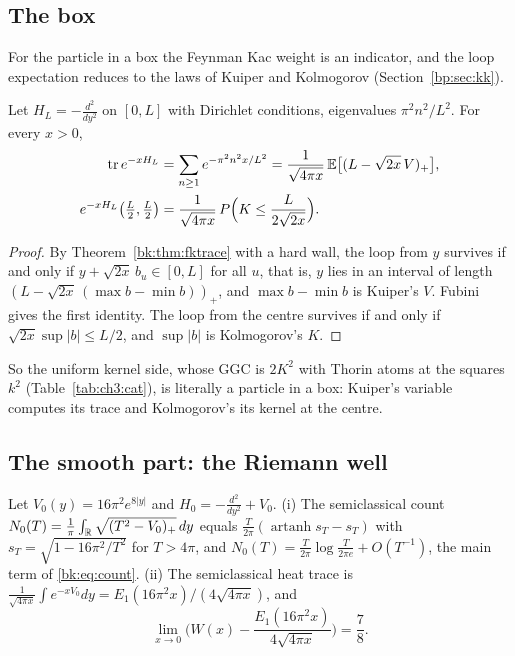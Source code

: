 \subsection{The box}

For the particle in a box the Feynman Kac weight is an indicator, and the loop expectation reduces to the laws of Kuiper and Kolmogorov (Section~\ref{bp:sec:kk}).

\begin{theorem}\label{bk:thm:box}
Let $H_L=-\frac{d^2}{dy^2}$ on $[0,L]$ with Dirichlet conditions, eigenvalues $\pi^2n^2/L^2$. For every $x>0$,
\begin{align*}
\operatorname{tr}e^{-xH_L}&=\sum_{n\ge1}e^{-\pi^2n^2x/L^2}=\frac1{\sqrt{4\pi x}}\,\mathbb{E}\big[(L-\sqrt{2x}\,V)_+\big],\\
e^{-xH_L}\big(\tfrac L2,\tfrac L2\big)&=\frac1{\sqrt{4\pi x}}\,P\Big(K\le\frac L{2\sqrt{2x}}\Big).
\end{align*}
\end{theorem}

\begin{proof}
By Theorem~\ref{bk:thm:fktrace} with a hard wall, the loop from $y$ survives if and only if $y+\sqrt{2x}\,b_u\in[0,L]$ for all $u$, that is, $y$ lies in an interval of length $(L-\sqrt{2x}\,(\max b-\min b))_+$, and $\max b-\min b$ is Kuiper's $V$. Fubini gives the first identity. The loop from the centre survives if and only if $\sqrt{2x}\sup|b|\le L/2$, and $\sup|b|$ is Kolmogorov's $K$.
\end{proof}

So the uniform kernel side, whose GGC is $2K^2$ with Thorin atoms at the squares $k^2$ (Table~\ref{tab:ch3:cat}), is literally a particle in a box: Kuiper's variable computes its trace and Kolmogorov's its kernel at the centre.
\subsection{The smooth part: the Riemann well}

\begin{theorem}\label{bk:thm:well}
Let $V_0(y)=16\pi^2e^{8|y|}$ and $H_0=-\frac{d^2}{dy^2}+V_0$. \textup{(i)} The semiclassical count $N_0(T)=\frac1\pi\int_{\mathbb{R}}\sqrt{(T^2-V_0)_+}\,dy$ equals $\frac T{2\pi}(\operatorname{artanh}s_T-s_T)$ with $s_T=\sqrt{1-16\pi^2/T^2}$ for $T>4\pi$, and $N_0(T)=\frac T{2\pi}\log\frac T{2\pi e}+O(T^{-1})$, the main term of \eqref{bk:eq:count}. \textup{(ii)} The semiclassical heat trace is $\frac1{\sqrt{4\pi x}}\int e^{-xV_0}dy=E_1(16\pi^2x)/(4\sqrt{4\pi x})$, and
\[
\lim_{x\to0}\Big(W(x)-\frac{E_1(16\pi^2x)}{4\sqrt{4\pi x}}\Big)=\frac78 .
\]
\end{theorem}

